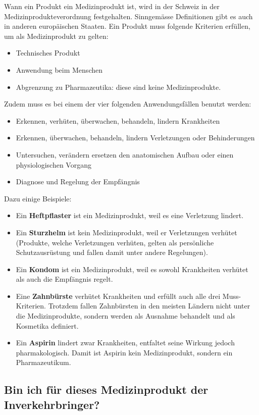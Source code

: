 Wann ein Produkt ein Medizinprodukt ist, wird in der Schweiz in der Medizinprodukteverordnung festgehalten. Sinngemässe Definitionen gibt es auch in anderen europäischen Staaten. Ein Produkt muss folgende Kriterien erfüllen, um als Medizinprodukt zu gelten:
\begin{itemize}
	\item Technisches Produkt
	\item Anwendung beim Menschen
	\item Abgrenzung zu Pharmazeutika: diese sind keine Medizinprodukte.
\end{itemize}
Zudem muss es bei einem der vier folgenden Anwendungsfällen benutzt werden:
\begin{itemize}
	\item Erkennen, verhüten, überwachen, behandeln, lindern Krankheiten
	\item Erkennen, überwachen, behandeln, lindern Verletzungen oder Behinderungen
	\item Untersuchen, verändern ersetzen den anatomischen Aufbau oder einen physiologischen Vorgang
	\item Diagnose und Regelung der Empfängnis
\end{itemize}
Dazu einige Beispiele:
\begin{itemize}
	\item Ein \textbf{Heftpflaster} ist ein Medizinprodukt, weil es eine Verletzung lindert.
	\item Ein \textbf{Sturzhelm} ist kein Medizinprodukt, weil er Verletzungen verhütet (Produkte, welche Verletzungen verhüten, gelten als persönliche Schutzausrüstung und fallen damit unter andere Regelungen).
	\item Ein \textbf{Kondom} ist ein Medizinprodukt, weil es sowohl Krankheiten verhütet als auch die Empfängnis regelt.
	\item Eine \textbf{Zahnbürste} verhütet Krankheiten und erfüllt auch alle drei Muss-Kriterien. Trotzdem fallen Zahnbürsten in den meisten Ländern nicht unter die Medizinprodukte, sondern werden als Ausnahme behandelt und als Kosmetika definiert.
	\item Ein \textbf{Aspirin} lindert zwar Krankheiten, entfaltet seine Wirkung jedoch pharmakologisch. Damit ist Aspirin kein Medizinprodukt, sondern ein Pharmazeutikum.
\end{itemize}

\subsection{Bin ich für dieses Medizinprodukt der Inverkehrbringer?}

